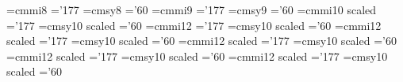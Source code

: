 \font\eighti=cmmi8 \skewchar\eighti='177
\font\eightsy=cmsy8 \skewchar\eightsy='60
%
%
\font\ninei=cmmi9 \skewchar\ninei='177
\font\ninesy=cmsy9 \skewchar\ninesy='60
%
%
\font\eleveni=cmmi10 scaled \magstephalf \skewchar\eleveni='177
\font\elevensy=cmsy10 scaled \magstephalf \skewchar\elevensy='60
%
%
\font\twelvei=cmmi12 \skewchar\twelvei='177
\font\twelvesy=cmsy10 scaled  \skewchar\twelvesy='60
%
%
\font\frti=cmmi12 scaled  \skewchar\frti='177
\font\frtsy=cmsy10 scaled  \skewchar\frtsy='60
%
%
\font\svti=cmmi12 scaled  \skewchar\svti='177
\font\svtsy=cmsy10 scaled  \skewchar\svtsy='60
%
%
\font\twtyi=cmmi12 scaled  \skewchar\twtyi='177
\font\twtysy=cmsy10 scaled \skewchar\twtysy='60
%
%
\font\twfvi=cmmi12 scaled  \skewchar\twfvi='177
\font\twfvsy=cmsy10 scaled  \skewchar\twfvsy='60
%
%
%
\def\Twfvpoint{\normalbaselineskip=30pt
  \def\rm{\fam0\twfvrm}%
  \def\it{\fam\itfam\twfvit}%
  \def\sl{\fam\slfam\twfvsl}%
  \def\bf{\fam\bffam\twfvbf}%
  \def\smc{\twfvrm}%
  \def\mit{\fam 1}%
  \def\cal{\fam 2}%
  \textfont0=\twfvrm   \scriptfont0=\twtyrm   \scriptscriptfont0=\svtrm
  \textfont1=\twfvi    \scriptfont1=\twtyi    \scriptscriptfont1=\svti
  \textfont2=\twfvsy   \scriptfont2=\twtysy   \scriptscriptfont2=\svtsy
  \textfont3=\tenex   \scriptfont3=\tenex     \scriptscriptfont3=\tenex
  \textfont\itfam=\twfvit \scriptfont\itfam=\twtyit
  \textfont\slfam=\twfvsl \scriptfont\slfam=\twtysl
  \textfont\bffam=\twfvbf \scriptfont\bffam=\twtybf
  \scriptscriptfont\bffam=\twtybf
  \setbox\strutbox=\hbox{\vrule height 22pt depth 8pt width 0pt}%
  \def\tt{\twfvtt}\normalbaselines\rm
}
\def\twfvpoint{\Twfvpoint}
%
\def\Twtypoint{\normalbaselineskip=25pt
  \def\rm{\fam0\twtyrm}%
  \def\it{\fam\itfam\twtyit}%
  \def\sl{\fam\slfam\twtysl}%
  \def\bf{\fam\bffam\twtybf}%
  \def\smc{\twtyrm}%
  \def\mit{\fam 1}%
  \def\cal{\fam 2}%
  \textfont0=\twtyrm   \scriptfont0=\svtrm   \scriptscriptfont0=\frtrm
  \textfont1=\twtyi    \scriptfont1=\svti    \scriptscriptfont1=\frti
  \textfont2=\twtysy   \scriptfont2=\svtsy   \scriptscriptfont2=\frtsy
  \textfont3=\tenex   \scriptfont3=\tenex     \scriptscriptfont3=\tenex
  \textfont\itfam=\twtyit \scriptfont\itfam=\svtit
  \textfont\slfam=\twtysl \scriptfont\slfam=\svtsl
  \textfont\bffam=\twtybf \scriptfont\bffam=\svtbf
  \scriptscriptfont\bffam=\svtbf
  \setbox\strutbox=\hbox{\vrule height 18pt depth 7pt width 0pt}%
  \def\tt{\twtytt}\normalbaselines\rm}
